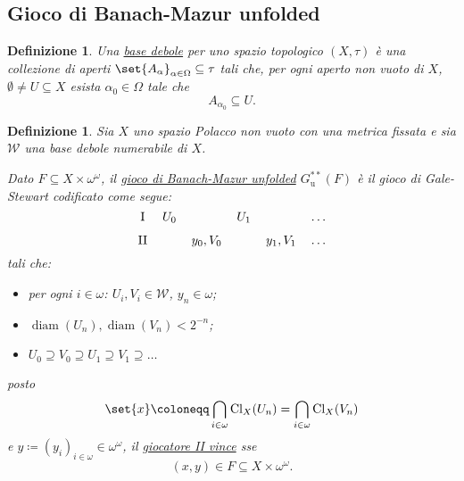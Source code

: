 \documentclass[titlepage]{article}
\newcommand{\1}{\mathds{1}}
\theoremstyle{definition}%
\theoremstyle{plain}
\newtheorem{defn}[thm]{Definizione}
\theoremstyle{remark}
\begin{document}
\subsection{Gioco di Banach-Mazur unfolded}
\label{sec:org8e1057c}

\begin{defn}
Una \uline{base debole} per uno spazio topologico \((X,\tau)\) è una collezione di aperti \(\set{A_{\alpha}}_{\alpha \in \Omega} \subseteq \tau\) tali che, per ogni aperto non vuoto di \(X\), \(\emptyset\neq U \subseteq X\) esista \(\alpha_{0} \in \Omega\) tale che
\begin{equation*}
A_{\alpha_{0}} \subseteq U.
\end{equation*}

\end{defn}

\begin{defn}
Sia \(X\) uno {spazio Polacco} non vuoto con una {metrica} fissata e sia \(\mathcal{W}\) una {base debole} {numerabile} di \(X\).

Dato \(F \subseteq X\times \omega^{\omega}\), il \uline{gioco di Banach-Mazur unfolded} \(G^{**}_{\text{u}}(F)\) è il {gioco} {di Gale-Stewart} codificato come segue:
\begin{equation*}
\begin{tikzcd}[ampersand replacement=\&,cramped,sep=tiny]
	{\text{I}} \& {U_0} \&\& {U_1} \&\& \dots \\
	{\text{II}} \&\& {y_0,V_0} \&\& {y_1, V_{1}} \& \dots
\end{tikzcd}
\end{equation*}
tali che:
\begin{itemize}
\item per ogni \(i \in \omega\): \(U_{i}, V_{i} \in \mathcal{W}\), \(y_{n} \in \omega\);
\item \(\operatorname{diam}(U_{n}), \operatorname{diam}(V_{n}) < 2^{-n}\);
\item \(U_{0}\supseteq V_{0}\supseteq U_{1}\supseteq V_{1}\supseteq \dots\)
\end{itemize}

posto
\begin{equation*}
\set{x}\coloneqq\bigcap_{i \in \omega} \operatorname{Cl}_{X}(U_{n}) = \bigcap_{i \in \omega} \operatorname{Cl}_{X}(V_{n})
\end{equation*}
e \(y\coloneqq (y_{i})_{i \in \omega} \in \omega^{\omega}\), il \uline{giocatore II vince} sse
\begin{equation*}
(x,y) \in F \subseteq X\times \omega^{\omega}.
\end{equation*}
\end{defn}
\end{document}
